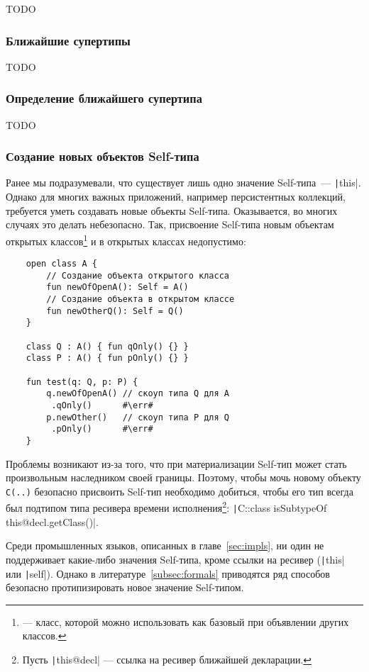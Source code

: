 TODO %

\subsubsection{Ближайшие супертипы}

TODO %

\subsubsection{Определение ближайшего супертипа}

TODO %

\subsubsection{Создание новых объектов Self-типа}

Ранее мы подразумевали, что существует лишь одно значение Self-типа~--- \texttt|this|.
Однако для многих важных приложений, например персистентных коллекций, требуется уметь создавать новые объекты Self-типа.
Оказывается, во многих случаях это делать небезопасно.
Так, присвоение Self-типа новым объектам открытых классов\footnote{ --- класс, которой можно использовать как базовый при объявлении других классов.} и в открытых классах недопустимо:

\begin{verbatim}
    open class A {
        // Создание объекта открытого класса
        fun newOfOpenA(): Self = A()
        // Создание объекта в открытом классе
        fun newOtherQ(): Self = Q()
    }

    class Q : A() { fun qOnly() {} }
    class P : A() { fun pOnly() {} }

    fun test(q: Q, p: P) {
        q.newOfOpenA() // скоуп типа Q для A
         .qOnly()      #\err#
        p.newOther()   // скоуп типа P для Q
         .pOnly()      #\err#
    }
\end{verbatim}

Проблемы возникают из-за того, что при материализации Self-тип может стать произвольным наследником своей границы.
Поэтому, чтобы мочь новому объекту \texttt{C(..)} безопасно присвоить Self-тип необходимо добиться, чтобы его тип всегда был подтипом типа ресивера времени исполнения\footnote{Пусть \texttt|this@decl| --- ссылка на ресивер ближайшей декларации.}:
\texttt|C::class isSubtypeOf this@decl.getClass()|.

Среди промышленных языков, описанных в главе~\ref{sec:impls}, ни один не поддерживает какие-либо значения Self-типа, кроме ссылки на ресивер (\texttt|this| или \texttt|self|).
Однако в литературе~\ref{subsec:formals} приводятся ряд способов безопасно протипизировать новое значение Self-типом.

